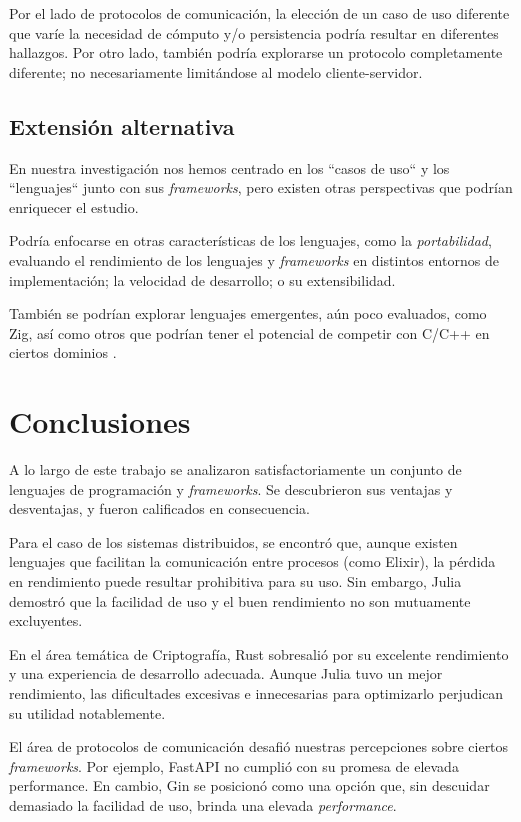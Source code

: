 \documentclass[11pt]{article}
\let\Oldsection\section
\renewcommand{\section}{\FloatBarrier\Oldsection}
\let\Oldsubsection\subsection
\renewcommand{\subsection}{\FloatBarrier\Oldsubsection}
\newcommand{\english}[1]{\textit{#1}}
\begin{document}
Por el lado de protocolos de comunicación, la elección de un caso de uso diferente que varíe la necesidad de cómputo y/o persistencia podría resultar en diferentes hallazgos. Por otro lado, también podría explorarse un protocolo completamente diferente; no necesariamente limitándose al modelo cliente-servidor.

\subsection{Extensión alternativa}

En nuestra investigación nos hemos centrado en los ``casos de uso`` y los ``lenguajes`` junto con sus \english{frameworks}, pero existen otras perspectivas que podrían enriquecer el estudio.

Podría enfocarse en otras características de los lenguajes, como la \textit{portabilidad}, evaluando el rendimiento de los lenguajes y \english{frameworks} en distintos entornos de implementación; la velocidad de desarrollo; o su extensibilidad.

También se podrían explorar lenguajes emergentes, aún poco evaluados, como Zig, así como otros que podrían tener el potencial de competir con C/C++ en ciertos dominios \cite{cpp_killers}.

\section{Conclusiones}

A lo largo de este trabajo se analizaron satisfactoriamente un conjunto de lenguajes de programación y \textit{frameworks}. Se descubrieron sus ventajas y desventajas, y fueron calificados en consecuencia.

Para el caso de los sistemas distribuidos, se encontró que, aunque existen lenguajes que facilitan la comunicación entre procesos (como Elixir), la pérdida en rendimiento puede resultar prohibitiva para su uso. Sin embargo, Julia demostró que la facilidad de uso y el buen rendimiento no son mutuamente excluyentes.

En el área temática de Criptografía, Rust sobresalió por su excelente rendimiento y una experiencia de desarrollo adecuada. Aunque Julia tuvo un mejor rendimiento, las dificultades excesivas e innecesarias para optimizarlo perjudican su utilidad notablemente.


El área de protocolos de comunicación desafió nuestras percepciones sobre ciertos \textit{frameworks}. Por ejemplo, FastAPI no cumplió con su promesa de elevada performance. En cambio, Gin se posicionó como una opción que, sin descuidar demasiado la facilidad de uso, brinda una elevada \english{performance}.
\end{document}
